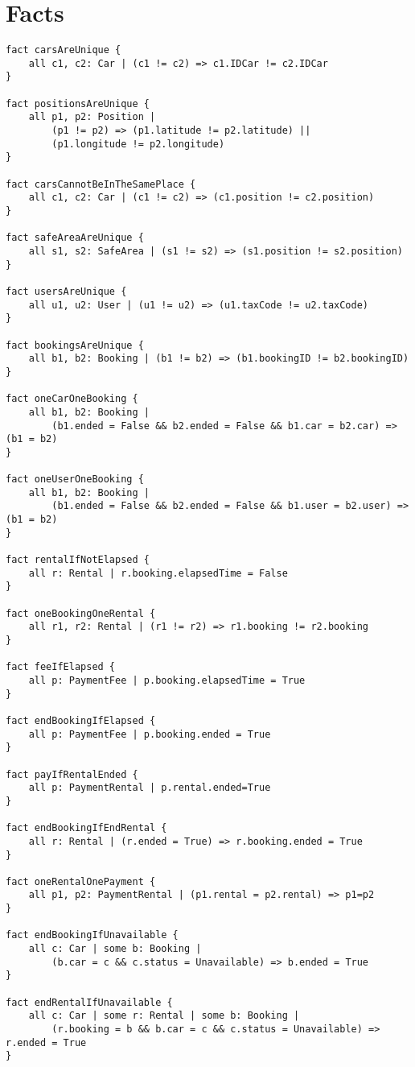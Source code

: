 \newpage

\section{Facts}

\lstset{language=alloy}

\begin{lstlisting}
fact carsAreUnique {
	all c1, c2: Car | (c1 != c2) => c1.IDCar != c2.IDCar
}

fact positionsAreUnique {
	all p1, p2: Position |
		(p1 != p2) => (p1.latitude != p2.latitude) ||
		(p1.longitude != p2.longitude)
}

fact carsCannotBeInTheSamePlace {
	all c1, c2: Car | (c1 != c2) => (c1.position != c2.position)
}

fact safeAreaAreUnique {
	all s1, s2: SafeArea | (s1 != s2) => (s1.position != s2.position)
}

fact usersAreUnique {
	all u1, u2: User | (u1 != u2) => (u1.taxCode != u2.taxCode)
}

fact bookingsAreUnique {
	all b1, b2: Booking | (b1 != b2) => (b1.bookingID != b2.bookingID)
}

fact oneCarOneBooking {
	all b1, b2: Booking |
		(b1.ended = False && b2.ended = False && b1.car = b2.car) => (b1 = b2)
}

fact oneUserOneBooking {
	all b1, b2: Booking |
		(b1.ended = False && b2.ended = False && b1.user = b2.user) => (b1 = b2)
}

fact rentalIfNotElapsed {
	all r: Rental | r.booking.elapsedTime = False
}

fact oneBookingOneRental {
	all r1, r2: Rental | (r1 != r2) => r1.booking != r2.booking
}

fact feeIfElapsed {
	all p: PaymentFee | p.booking.elapsedTime = True
}

fact endBookingIfElapsed {
	all p: PaymentFee | p.booking.ended = True
}

fact payIfRentalEnded {
	all p: PaymentRental | p.rental.ended=True
}

fact endBookingIfEndRental {
	all r: Rental | (r.ended = True) => r.booking.ended = True
}

fact oneRentalOnePayment {
	all p1, p2: PaymentRental | (p1.rental = p2.rental) => p1=p2
}

fact endBookingIfUnavailable {
	all c: Car | some b: Booking |
		(b.car = c && c.status = Unavailable) => b.ended = True
}

fact endRentalIfUnavailable {
	all c: Car | some r: Rental | some b: Booking |
		(r.booking = b && b.car = c && c.status = Unavailable) => r.ended = True
}


\end{lstlisting}
